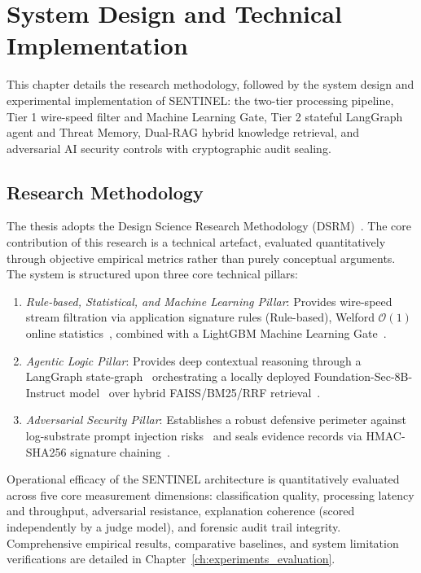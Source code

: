 \chapter{System Design and Technical Implementation}
\label{ch:system_design_implementation}

This chapter details the research methodology, followed by the system design and experimental implementation of SENTINEL: the two-tier processing pipeline, Tier 1 wire-speed filter and Machine Learning Gate, Tier 2 stateful LangGraph agent and Threat Memory, Dual-RAG hybrid knowledge retrieval, and adversarial AI security controls with cryptographic audit sealing.

\section{Research Methodology}
\label{sec:methodology}

The thesis adopts the Design Science Research Methodology (DSRM)~\cite{peffers2007}. The core contribution of this research is a technical artefact, evaluated quantitatively through objective empirical metrics rather than purely conceptual arguments. The system is structured upon three core technical pillars:
\begin{enumerate}[leftmargin=*,label=\arabic*.]
    \item \textit{Rule-based, Statistical, and Machine Learning Pillar}: Provides wire-speed stream filtration via application signature rules (Rule-based), Welford $\mathcal{O}(1)$ online statistics~\cite{welford1962}, combined with a LightGBM Machine Learning Gate~\cite{ke2017lightgbm}.
    \item \textit{Agentic Logic Pillar}: Provides deep contextual reasoning through a LangGraph state-graph~\cite{langgraph2024} orchestrating a locally deployed Foundation-Sec-8B-Instruct model~\cite{foundation_sec_instruct} over hybrid FAISS/BM25/RRF retrieval~\cite{faiss2019, bm25_2009, rrf2009}.
    \item \textit{Adversarial Security Pillar}: Establishes a robust defensive perimeter against log-substrate prompt injection risks~\cite{promptinjection2023, owasp_llm2025} and seals evidence records via HMAC-SHA256 signature chaining~\cite{hmac1997}.
\end{enumerate}

Operational efficacy of the SENTINEL architecture is quantitatively evaluated across five core measurement dimensions: classification quality, processing latency and throughput, adversarial resistance, explanation coherence (scored independently by a judge model), and forensic audit trail integrity. Comprehensive empirical results, comparative baselines, and system limitation verifications are detailed in Chapter~\ref{ch:experiments_evaluation}.

